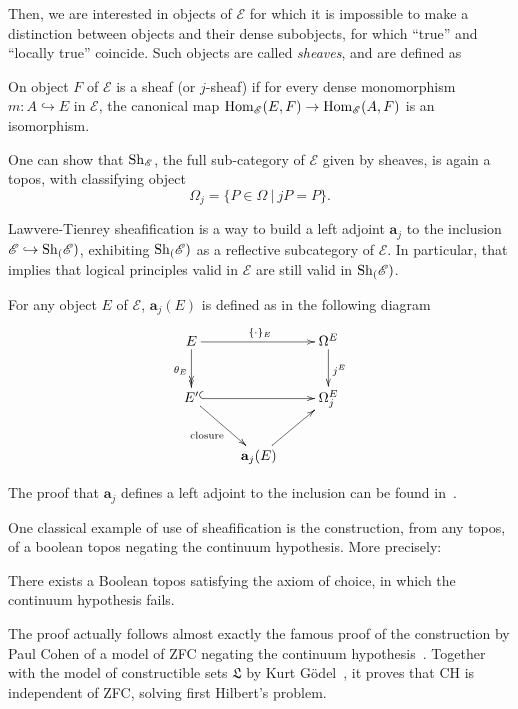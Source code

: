 Then, we are interested in objects of $\mathcal E$ for which it is
impossible to make a distinction between objects and their dense
subobjects, \ie{} for which ``true'' and ``locally true''
coincide. Such objects are called {\em sheaves}, and are defined as

\begin{defi}
  On object $F$ of $\mathcal E$ is a sheaf (or $j$-sheaf) if for every
  dense monomorphism $m: A \hookrightarrow E$ in $\mathcal E$, the
  canonical map $\mathrm{Hom}_{\mathcal E}(E,F) \rightarrow \mathrm{Hom}_{\mathcal E}(A,F)$ is an
isomorphism.
\end{defi}

One can show that $\mathrm{Sh}_{\mathcal E}$, the full sub-category of
$\mathcal E$ given by
sheaves, is again a topos, with classifying object
%
\[
\Omega_j = \{ P \in \Omega \ | \ j P  = P \}.
\]

Lawvere-Tienrey sheafification is a way to build a left adjoint $\mathbf{a}_j$ to the
inclusion $\mathcal E \hookrightarrow \mathrm{Sh}_{(}\mathcal E)$, exhibiting
$\mathrm{Sh}_{(}\mathcal E)$ as a reflective subcategory of $\mathcal E$. In
particular, that implies that logical principles valid in $\mathcal E$
are still valid in $\mathrm{Sh}_{(}\mathcal E)$.

For any object $E$ of $\mathcal E$, $\mathbf{a}_j(E)$ is defined as in
the following diagram
\[
  \xymatrix{ 
    E \ar[rr]^{\{\cdot\}_E} \ar@{->>}[d]_{\theta_E} && \Omega^E \ar[d]^{j^E}\\
    E' \ar@{^{(}->}[rr] \ar[dr]_{\text{closure}} && \Omega_j^E \\
    & \mathbf{a}_j(E) \ar[ur]&
  }
\]

The proof that $\mathbf a_j$ defines a left adjoint to the inclusion
can be found in~\cite{maclanemoerdijk}.

One classical example of use of sheafification is the construction,
from any topos, of a boolean topos negating the continuum
hypothesis. More precisely:

\begin{thm}
  There exists a Boolean topos satisfying the axiom of choice, in
  which the continuum hypothesis fails.
\end{thm}

The proof actually follows almost exactly the famous proof of the
construction by Paul Cohen of a model of ZFC negating the continuum
hypothesis~\cite{cohen1966}. Together with the model of constructible
sets $\mathfrak L$ by Kurt Gödel~\cite{godel40}, it proves that CH is
independent of ZFC, solving first Hilbert's problem.


